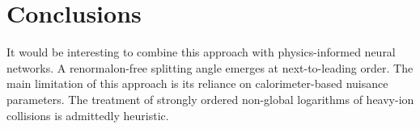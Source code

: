 \section{Conclusions}\label{sec:conclusions}

It would be interesting to combine this approach with physics-informed
neural networks. A renormalon-free splitting angle emerges at
next-to-leading order. The main limitation of this approach is its
reliance on calorimeter-based nuisance parameters. The treatment of
strongly ordered non-global logarithms of heavy-ion collisions is
admittedly heuristic.

